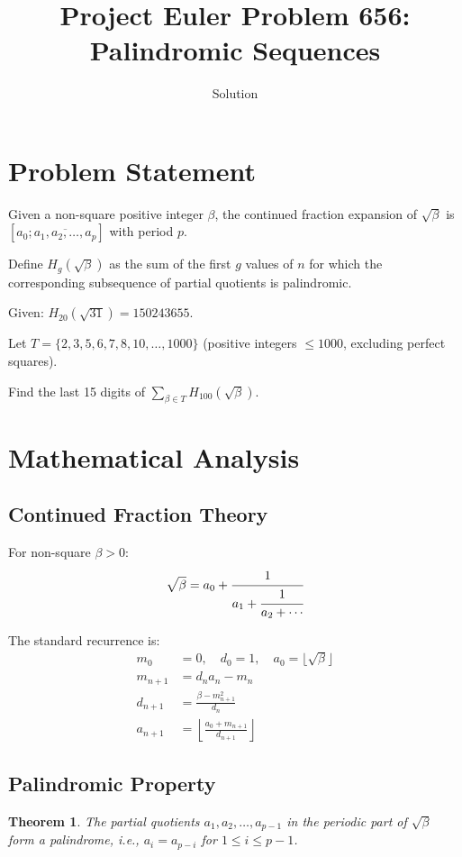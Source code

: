 \documentclass[12pt]{article}
\title{Project Euler Problem 656: Palindromic Sequences}
\author{Solution}
\date{}
\newtheorem{theorem}{Theorem}
\theoremstyle{definition}
\begin{document}
\maketitle

\section{Problem Statement}

Given a non-square positive integer $\beta$, the continued fraction expansion of $\sqrt{\beta}$ is
$[a_0; \overline{a_1, a_2, \ldots, a_p}]$ with period $p$.

Define $H_g(\sqrt{\beta})$ as the sum of the first $g$ values of $n$ for which the corresponding subsequence of partial quotients is palindromic.

Given: $H_{20}(\sqrt{31}) = 150243655$.

Let $T = \{2, 3, 5, 6, 7, 8, 10, \ldots, 1000\}$ (positive integers $\leq 1000$, excluding perfect squares).

Find the last 15 digits of $\displaystyle\sum_{\beta \in T} H_{100}(\sqrt{\beta})$.

\section{Mathematical Analysis}

\subsection{Continued Fraction Theory}

For non-square $\beta > 0$:
\[
\sqrt{\beta} = a_0 + \cfrac{1}{a_1 + \cfrac{1}{a_2 + \cdots}}
\]

The standard recurrence is:
\begin{align}
m_0 &= 0, \quad d_0 = 1, \quad a_0 = \lfloor \sqrt{\beta} \rfloor \\
m_{n+1} &= d_n a_n - m_n \\
d_{n+1} &= \frac{\beta - m_{n+1}^2}{d_n} \\
a_{n+1} &= \left\lfloor \frac{a_0 + m_{n+1}}{d_{n+1}} \right\rfloor
\end{align}

\subsection{Palindromic Property}

\begin{theorem}
The partial quotients $a_1, a_2, \ldots, a_{p-1}$ in the periodic part of $\sqrt{\beta}$ form a palindrome, i.e., $a_i = a_{p-i}$ for $1 \leq i \leq p-1$.
\end{theorem}
\end{document}
